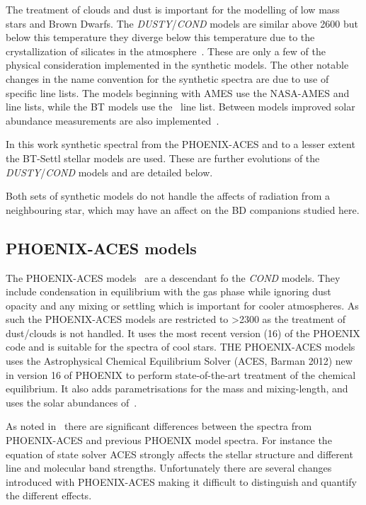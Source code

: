 The treatment of clouds and dust is important for the modelling of low mass stars and Brown Dwarfs.
The \emph{DUSTY}/\emph{COND} models are similar above 2600\K{} but below this temperature they diverge below this temperature due to the crystallization of silicates in the atmosphere~\citep{allard_limiting_2001}.
These are only a few of the physical consideration implemented in the synthetic models.
The other notable changes in the name convention for the synthetic spectra are due to use of specific line lists.
The models beginning with {AMES} use the {NASA-AMES}  and  line lists, while the {BT} models use the~\citet{barber_highaccuracy_2006}  line list.
Between models improved solar abundance measurements are also implemented~\citep[][]{asplund_chemical_2009}.

In this work synthetic spectral from the {PHOENIX-ACES} and to a lesser extent the {BT-Settl} stellar models are used.
These are further evolutions of the \emph{DUSTY}/\emph{COND} models and are detailed below.

Both sets of synthetic models do not handle the affects of radiation from a neighbouring star, which may have an affect on the BD companions studied here.

\subsection{{PHOENIX-ACES} models}
\label{subsec:phoenix_aces}

The {PHOENIX-ACES} models~\citep{husser_new_2013} are a descendant fo the \emph{COND} models.
They include condensation in equilibrium with the gas phase while ignoring dust opacity and any mixing or settling which is important for cooler atmospheres.
As such the {PHOENIX-ACES} models are restricted to \txteff{}>2300\K{} as the treatment of dust/clouds is not handled.
It uses the most recent version (16) of the {PHOENIX} code and is suitable for the spectra of cool stars.
THE {PHOENIX-ACES} models uses the Astrophysical Chemical Equilibrium Solver (ACES, Barman 2012) new in version 16 of {PHOENIX} to perform state-of-the-art treatment of the chemical equilibrium.
It also adds parametrisations for the mass and mixing-length, and uses the solar abundances of~\citet{asplund_chemical_2009}.

As noted in~\citep{husser_new_2013} there are significant differences between the spectra from {PHOENIX-ACES} and previous {PHOENIX} model spectra.
For instance the equation of state solver ACES strongly affects the stellar structure and different line and molecular band strengths.
Unfortunately there are several changes introduced with {PHOENIX-ACES} making it difficult to distinguish and quantify the different effects.

